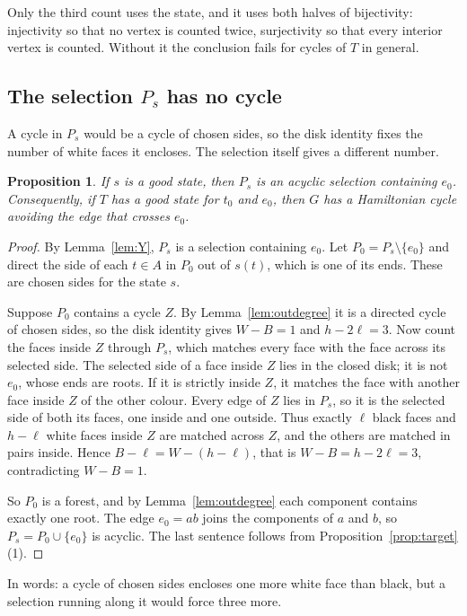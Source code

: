 \documentclass[10pt]{amsart}
\numberwithin{equation}{section}
\newtheorem{proposition}[equation]{Proposition}
\theoremstyle{definition}
\theoremstyle{remark}
\newcommand{\T}{T}
\begin{document}
Only the third count uses the state, and it uses both halves of bijectivity: injectivity so that no vertex is counted twice, surjectivity so that every interior vertex is counted.
Without it the conclusion fails for cycles of $\T$ in general.

\subsection*{The selection $P_s$ has no cycle}
A cycle in $P_s$ would be a cycle of chosen sides, so the disk identity fixes the number of white faces it encloses.
The selection itself gives a different number.

\begin{proposition}\label{prop:recover}
If $s$ is a good state, then $P_s$ is an acyclic selection containing $e_0$.
Consequently, if $\T$ has a good state for $t_0$ and $e_0$, then $G$ has a Hamiltonian cycle avoiding the edge that crosses $e_0$.
\end{proposition}

\begin{proof}
By Lemma~\ref{lem:Y}, $P_s$ is a selection containing $e_0$.
Let $P_0=P_s\setminus\{e_0\}$ and direct the side of each $t\in A$ in $P_0$ out of $s(t)$, which is one of its ends.
These are chosen sides for the state $s$.

Suppose $P_0$ contains a cycle $Z$.
By Lemma~\ref{lem:outdegree} it is a directed cycle of chosen sides, so the disk identity gives $W-B=1$ and $h-2\ell=3$.
Now count the faces inside $Z$ through $P_s$, which matches every face with the face across its selected side.
The selected side of a face inside $Z$ lies in the closed disk; it is not $e_0$, whose ends are roots.
If it is strictly inside $Z$, it matches the face with another face inside $Z$ of the other colour.
Every edge of $Z$ lies in $P_s$, so it is the selected side of both its faces, one inside and one outside.
Thus exactly $\ell$ black faces and $h-\ell$ white faces inside $Z$ are matched across $Z$, and the others are matched in pairs inside.
Hence $B-\ell=W-(h-\ell)$, that is $W-B=h-2\ell=3$, contradicting $W-B=1$.

So $P_0$ is a forest, and by Lemma~\ref{lem:outdegree} each component contains exactly one root.
The edge $e_0=ab$ joins the components of $a$ and $b$, so $P_s=P_0\cup\{e_0\}$ is acyclic.
The last sentence follows from Proposition~\ref{prop:target}(1).
\end{proof}

In words: a cycle of chosen sides encloses one more white face than black, but a selection running along it would force three more.
\end{document}
